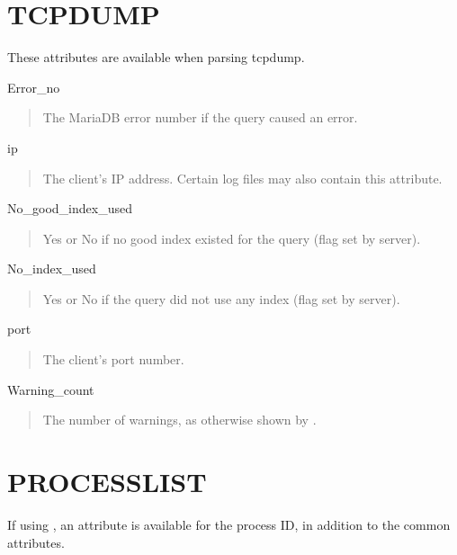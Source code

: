 \documentclass[letterpaper,10pt,english]{sphinxmanual}
\begin{document}
\section{TCPDUMP}
\label{\detokenize{mariadb-query-digest:tcpdump}}
These attributes are available when parsing {\hyperref[\detokenize{mariadb-query-digest:cmdoption-mariadb-query-digest-type}]{}} tcpdump.

Error\_no
\begin{quote}

The MariaDB error number if the query caused an error.
\end{quote}

ip
\begin{quote}

The client’s IP address.  Certain log files may also contain this attribute.
\end{quote}

No\_good\_index\_used
\begin{quote}

Yes or No if no good index existed for the query (flag set by server).
\end{quote}

No\_index\_used
\begin{quote}

Yes or No if the query did not use any index (flag set by server).
\end{quote}

port
\begin{quote}

The client’s port number.
\end{quote}

Warning\_count
\begin{quote}

The number of warnings, as otherwise shown by .
\end{quote}


\section{PROCESSLIST}
\label{\detokenize{mariadb-query-digest:processlist}}
If using {\hyperref[\detokenize{mariadb-query-digest:cmdoption-mariadb-query-digest-processlist}]{}}, an  attribute is available for
the process ID, in addition to the common attributes.
\end{document}
